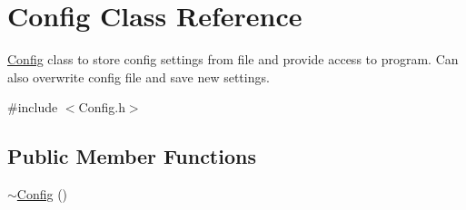 \hypertarget{class_config}{
\section{Config Class Reference}
\label{class_config}
}


\hyperlink{class_config}{Config} class to store config settings from file and provide access to program. Can also overwrite config file and save new settings.  




{\ttfamily \#include $<$Config.h$>$}

\subsection*{Public Member Functions}
\begin{DoxyCompactItemize}
\item 
\hypertarget{class_config_a543dce59b66475c5108088ee4ce1cdfc}{
\hyperlink{class_config_a543dce59b66475c5108088ee4ce1cdfc}{$\sim$Config} ()}
\label{class_config_a543dce59b66475c5108088ee4ce1cdfc}


\end{DoxyCompactItemize}
